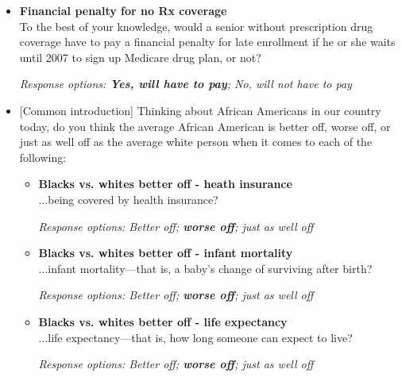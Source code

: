 \documentclass[12pt, letterpaper]{article}
\begin{document}
\begin{itemize}
\item \textbf{Financial penalty for no Rx coverage}\\
To the best of your knowledge, would a senior without prescription drug coverage have to pay a financial penalty for late enrollment if he or she waits until 2007 to sign up Medicare drug plan, or not?

\textit{Response options: \textbf{Yes, will have to pay}; No, will not have to pay} 
\end{itemize}

\begin{itemize}
\item{[Common introduction] Thinking about African Americans in our country today, do you think the average African American is better off, worse off, or just as well off as the average white person when it comes to each of the following:}

\begin{itemize}
\item \textbf{Blacks vs. whites better off - heath insurance}\\
...being covered by health insurance?

\textit{Response options: Better off; \textbf{worse off}; just as well off} 
\end{itemize}

\begin{itemize}
\item \textbf{Blacks vs. whites better off - infant mortality}\\
...infant mortality---that is, a baby's change of surviving after birth?

\textit{Response options: Better off; \textbf{worse off}; just as well off} 
\end{itemize}

\begin{itemize}
\item \textbf{Blacks vs. whites better off - life expectancy}\\
...life expectancy---that is, how long someone can expect to live?

\textit{Response options: Better off; \textbf{worse off}; just as well off} 
\end{itemize}

\end{itemize}
\end{document}
